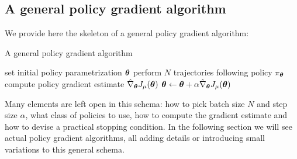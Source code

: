 \subsection{A general policy gradient algorithm}
We provide here the skeleton of a general policy gradient algorithm: 
\begin{algorithm}[H]
\caption{A general policy gradient algorithm}\label{alg:general}
\begin{algorithmic}
\State set initial policy parametrization $\boldsymbol{\theta}$
\State perform $N$ trajectories following policy $\pi_{\boldsymbol{\theta}}$
\State compute policy gradient estimate $\hat{\nabla}_{\boldsymbol{\theta}}J_{\mu}(\boldsymbol{\theta})$
\State $\boldsymbol{\theta} \gets \boldsymbol{\theta} + \alpha\hat{\nabla}_{\boldsymbol{\theta}}J_{\mu}(\boldsymbol{\theta})$
\EndWhile
\end{algorithmic}
\end{algorithm}
Many elements are left open in this schema: how to pick batch size $N$ and step size $\alpha$, what class of policies to use, how to compute the gradient estimate and how to devise a practical stopping condition. In the following section we will see actual policy gradient algorithms, all adding details or introducing small variations to this general schema. 